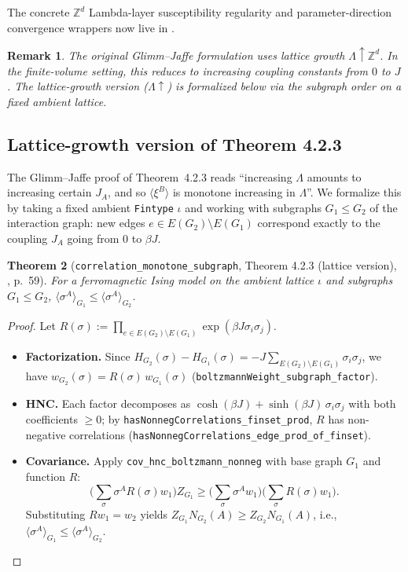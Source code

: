 \documentclass[a4paper,11pt]{article}
\newtheorem{theorem}{Theorem}
\newtheorem{remark}[theorem]{Remark}
\begin{document}
{\raggedright
The concrete $\mathbb{Z}^d$ Lambda-layer susceptibility regularity and
parameter-direction convergence wrappers now live in
.
\par}

\begin{remark}
The original Glimm--Jaffe formulation uses lattice growth
$\Lambda \uparrow \mathbb{Z}^d$. In the finite-volume setting,
this reduces to increasing coupling constants from $0$ to $J$.
The lattice-growth version ($\Lambda \uparrow$) is formalized
below via the subgraph order on a fixed ambient lattice.
\end{remark}

\subsection{Lattice-growth version of Theorem 4.2.3}

The Glimm--Jaffe proof of Theorem~4.2.3 reads
``increasing $\Lambda$ amounts to increasing certain $J_A$,
and so $\langle\xi^B\rangle$ is monotone increasing in $\Lambda$''.
We formalize this by taking a fixed ambient \texttt{Fintype} $\iota$
and working with subgraphs $G_1 \le G_2$ of the interaction graph:
new edges $e \in E(G_2) \setminus E(G_1)$ correspond exactly to the
coupling $J_A$ going from $0$ to $\beta J$.

\begin{theorem}[\texttt{correlation\_monotone\_subgraph},
  Theorem 4.2.3 (lattice version), \cite{glimm-jaffe}, p.~59]
For a ferromagnetic Ising model on the ambient lattice $\iota$
and subgraphs $G_1 \le G_2$,
$\langle \sigma^A\rangle_{G_1} \le \langle\sigma^A\rangle_{G_2}$.
\end{theorem}

\begin{proof}
Let $R(\sigma) := \prod_{e \in E(G_2)\setminus E(G_1)} \exp(\beta J \sigma_i\sigma_j)$.
\begin{itemize}
  \item \textbf{Factorization.} Since $H_{G_2}(\sigma) - H_{G_1}(\sigma) = -J\sum_{E(G_2)\setminus E(G_1)} \sigma_i\sigma_j$,
    we have $w_{G_2}(\sigma) = R(\sigma)\, w_{G_1}(\sigma)$
    (\texttt{boltzmannWeight\_subgraph\_factor}).
  \item \textbf{HNC.} Each factor decomposes as $\cosh(\beta J) + \sinh(\beta J)\,\sigma_i\sigma_j$
    with both coefficients $\ge 0$; by
    \texttt{hasNonnegCorrelations\_finset\_prod},
    $R$ has non-negative correlations
    (\texttt{hasNonnegCorrelations\_edge\_prod\_of\_finset}).
  \item \textbf{Covariance.} Apply \texttt{cov\_hnc\_boltzmann\_nonneg}
    with base graph $G_1$ and function $R$:
    \[
      \bigl(\textstyle\sum_\sigma \sigma^A R(\sigma) w_1\bigr)Z_{G_1}
      \ge \bigl(\sum_\sigma \sigma^A w_1\bigr)\bigl(\sum_\sigma R(\sigma) w_1\bigr).
    \]
    Substituting $R w_1 = w_2$ yields $Z_{G_1} N_{G_2}(A) \ge Z_{G_2} N_{G_1}(A)$,
    i.e., $\langle\sigma^A\rangle_{G_1} \le \langle\sigma^A\rangle_{G_2}$.
\end{itemize}
\end{proof}
\end{document}
